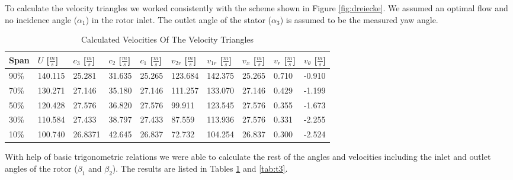 To calculate the velocity triangles we worked consistently with the scheme shown in Figure \ref{fig:dreiecke}. We assumed an optimal flow and no incidence angle ($\alpha_1$) in the rotor inlet. The outlet angle of the stator ($\alpha_3$) is assumed to be the measured yaw angle. 

\begin{table}[H]
\centering
    \begin{tabular}{|l|l|l|l|l|l|l|l|l|l|}
        \hline
        Span & $U$ [$\frac{m}{s}$] & $c_3$ [$\frac{m}{s}$]  & $c_2$ [$\frac{m}{s}$] & $c_1$ [$\frac{m}{s}$] & $v_{2r}$ [$\frac{m}{s}$] & $v_{1r}$ [$\frac{m}{s}$] & $v_{x}$ [$\frac{m}{s}$] & $v_{r}$ [$\frac{m}{s}$] & $v_{\theta}$ [$\frac{m}{s}$] \\ \hline
        90\%  & 140.115                   & 25.281  & 31.635 & 25.265      & 123.684  & 142.375 &  25.265& 0.710 & -0.910    \\ 
        70\%  & 130.271                   & 27.146  & 35.180 & 27.146      & 111.257  & 133.070  & 27.146 & 0.429 & -1.199 \\ 
        50\%  & 120.428                   & 27.576  & 36.820 & 27.576      & 99.911   & 123.545  & 27.576 & 0.355 & -1.673 \\ 
        30\%  & 110.584                   & 27.433  & 38.797 & 27.433      & 87.559   & 113.936  & 27.576 & 0.331 & -2.255 \\ 
        10\%  & 100.740                & 26.8371 & 42.645 & 26.837      & 72.732   & 104.254  & 26.837 & 0.300 & -2.524 \\
        \hline
    \end{tabular}
\caption{Calculated Velocities Of The Velocity Triangles}
\label{tab:t2}
\end{table}

With help of basic trigonometric relations we were able to calculate the rest of the angles and velocities including the inlet and outlet angles of the rotor ($\beta_1$ and $\beta_2$). The results are listed in Tables \ref{tab:t2} and \ref{tab:t3}. 

